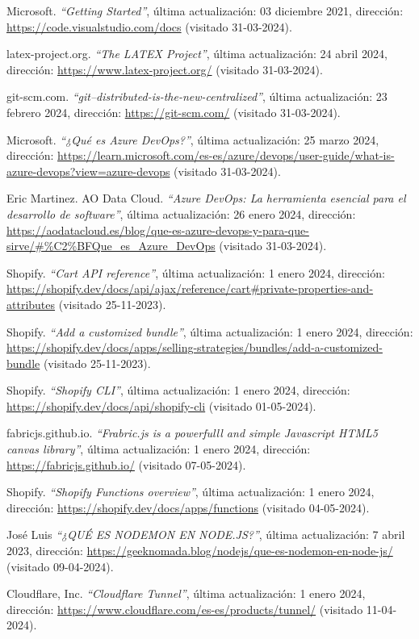 \documentclass[12pt]{article}
\begin{document}
\begin{thebibliography}{100}
    Microsoft.
    \textit{``Getting Started''}, última actualización: 03 diciembre 2021, dirección: \url{https://code.visualstudio.com/docs} (visitado 31-03-2024).

    latex-project.org.
    \textit{``The LATEX Project''}, última actualización: 24 abril 2024, dirección: \url{https://www.latex-project.org/} (visitado 31-03-2024).

    git-scm.com.
    \textit{``git--distributed-is-the-new-centralized''}, última actualización: 23 febrero 2024, dirección: \url{https://git-scm.com/} (visitado 31-03-2024).

    Microsoft.
    \textit{``¿Qué es Azure DevOps?''}, última actualización: 25 marzo 2024, dirección: \url{https://learn.microsoft.com/es-es/azure/devops/user-guide/what-is-azure-devops?view=azure-devops} (visitado 31-03-2024).

    Eric Martinez. AO Data Cloud.
    \textit{``Azure DevOps: La herramienta esencial para el desarrollo de software''}, última actualización: 26 enero 2024, dirección: \url{https://aodatacloud.es/blog/que-es-azure-devops-y-para-que-sirve/#%C2%BFQue_es_Azure_DevOps} (visitado 31-03-2024).

    Shopify.
    \textit{``Cart API reference''}, última actualización: 1 enero 2024, dirección: \url{https://shopify.dev/docs/api/ajax/reference/cart#private-properties-and-attributes} (visitado 25-11-2023).

    Shopify.
    \textit{``Add a customized bundle''}, última actualización: 1 enero 2024, dirección: \url{https://shopify.dev/docs/apps/selling-strategies/bundles/add-a-customized-bundle} (visitado 25-11-2023).

    Shopify.
    \textit{``Shopify CLI''}, última actualización: 1 enero 2024, dirección: \url{https://shopify.dev/docs/api/shopify-cli} (visitado 01-05-2024).

    fabricjs.github.io.
    \textit{``Frabric.js is a powerfulll and simple Javascript HTML5 canvas library''}, última actualización: 1 enero 2024, dirección: \url{https://fabricjs.github.io/} (visitado 07-05-2024).

    Shopify.
    \textit{``Shopify Functions overview''}, última actualización: 1 enero 2024, dirección: \url{https://shopify.dev/docs/apps/functions} (visitado 04-05-2024).

    José Luis
    \textit{``¿QUÉ ES NODEMON EN NODE.JS?''}, última actualización: 7 abril 2023, dirección: \url{https://geeknomada.blog/nodejs/que-es-nodemon-en-node-js/} (visitado 09-04-2024).

    Cloudflare, Inc.
    \textit{``Cloudflare Tunnel''}, última actualización: 1 enero 2024, dirección: \url{https://www.cloudflare.com/es-es/products/tunnel/} (visitado 11-04-2024).

\end{thebibliography}
\end{document}
